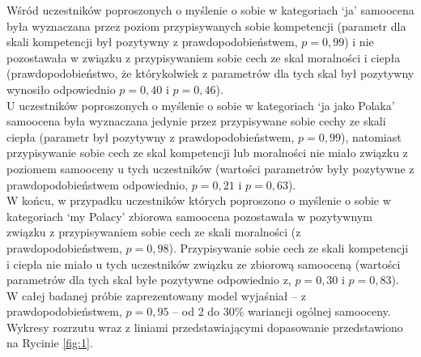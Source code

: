 \documentclass[man]{apa6}
\begin{document}
Wśród uczestników poproszonych o myślenie o sobie w kategoriach `ja' samoocena była wyznaczana przez poziom przypisywanych sobie kompetencji (parametr dla skali kompetencji był pozytywny z prawdopodobieństwem, $p = 0,99$) i nie pozostawała w związku z przypisywaniem sobie cech ze skal moralności i ciepła (prawdopodobieństwo, że którykolwiek z parametrów dla tych skal był pozytywny wynosiło odpowiednio $p = 0,40$ i $p = 0,46$). \\

U uczestników poproszonych o myślenie o sobie w kategoriach `ja jako Polaka' samoocena była wyznaczana jedynie przez przypisywane sobie cechy ze skali ciepła (parametr był pozytywny z prawdopodobieństwem, $p = 0,99$), natomiast przypisywanie sobie cech ze skal kompetencji lub moralności nie miało związku z poziomem samooceny u tych uczestników (wartości parametrów były pozytywne z prawdopodobieństwem odpowiednio, $p = 0,21$ i $p = 0,63$). \\

W końcu, w przypadku uczestników których poproszono o myślenie o sobie w kategoriach `my Polacy' zbiorowa samoocena pozostawała w pozytywnym związku z przypisywaniem sobie cech ze skali moralności (z prawdopodobieństwem, $p = 0,98$). Przypisywanie sobie cech ze skali kompetencji i ciepła nie miało u tych uczestników związku ze zbiorową samooceną (wartości parametrów dla tych skal byłe pozytywne odpowiednio z, $p = 0,30$ i $p = 0,83$).\\

W całej badanej próbie zaprezentowany model wyjaśniał -- z prawdopodobieństwem, $p = 0,95$ -- od 2 do 30\% wariancji ogólnej samooceny. Wykresy rozrzutu wraz z liniami przedstawiającymi dopasowanie przedstawiono na Rycinie \ref{fig:1}.\\
\end{document}
